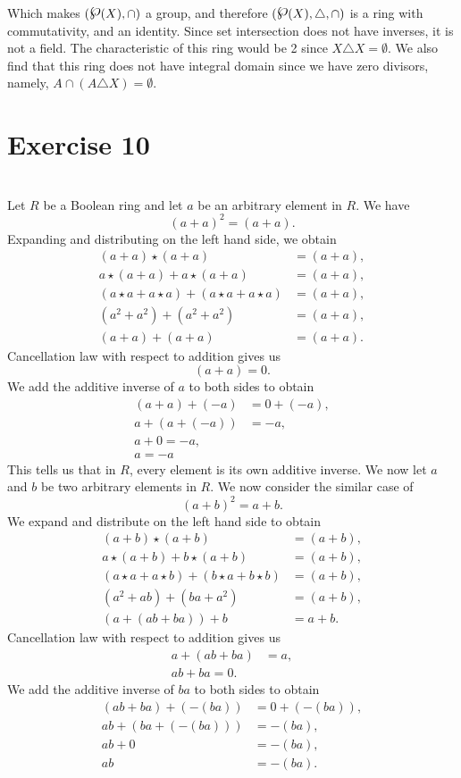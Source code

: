 \documentclass[12pt]{article}
\newcommand{\powerset}{\raisebox{.15\baselineskip}{\Large\ensuremath{\wp}}}
\begin{document}
Which makes $(\powerset(X), \cap)$ a group, and therefore $(\powerset(X), \triangle, \cap)$ is a ring with commutativity, and an identity. Since set intersection does not have inverses, it is not a field. The characteristic of this ring would be 2 since $X\triangle X = \emptyset$. We also find that this ring does not have integral domain since we have zero divisors, namely, $A\cap(A\triangle X) = \emptyset$.


\section*{Exercise 10}
\\

Let $R$ be a Boolean ring and let $a$ be an arbitrary element in $R$. We have
\[(a+a)^2 = (a+a).\]
Expanding and distributing on the left hand side, we obtain
\begin{align*}
    (a+a)\star(a+a) &= (a+a),\\
    a\star(a+a) + a\star(a+a) &= (a+a), \\
    (a\star a + a\star a) + (a\star a + a\star a) &= (a+a), \\
    (a^2 + a^2) + (a^2 + a^2) &= (a+a), \\
    (a+a) + (a+a) &= (a+a).
\end{align*}
Cancellation law with respect to addition gives us
\[(a+a) = 0.\]
We add the additive inverse of $a$ to both sides to obtain
\begin{align*}
    (a+a)+(-a) &= 0+(-a), \\
    a+(a+(-a)) &= -a, \\
    a + 0 = -a, \\
    a = -a
\end{align*}
This tells us that in $R$, every element is its own additive inverse.
We now let $a$ and $b$ be two arbitrary elements in $R$. We now consider the similar case of
\[(a+b)^2 = a+b.\]
We expand and distribute on the left hand side to obtain
\begin{align*}
    (a+b)\star(a+b) &= (a+b),\\
    a\star(a+b) + b\star(a+b) &= (a+b), \\
    (a\star a + a\star b) + (b\star a + b\star b) &= (a+b), \\
    (a^2 + ab) + (ba + a^2) &= (a+b), \\
    (a+(ab+ba))+b &= a+b.
\end{align*}
Cancellation law with respect to addition gives us
\begin{align*}
    a+(ab+ba) &= a, \\
    ab + ba = 0.
\end{align*}
We add the additive inverse of $ba$ to both sides to obtain
\begin{align*}
    (ab + ba) + (-(ba))  &= 0 + (-(ba)), \\
    ab + (ba + (-(ba))) &= -(ba), \\
    ab + 0 &= -(ba), \\
    ab &= -(ba).
\end{align*}
\end{document}
